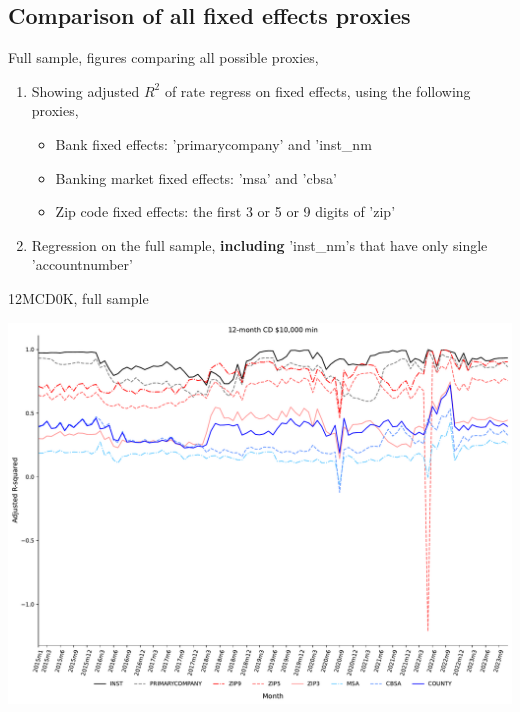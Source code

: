 \documentclass{beamer}
\begin{document}
\subsection{Comparison of all fixed effects proxies}

\begin{frame}
    \vfill
    \centering
    {Full sample, figures comparing all possible proxies,}
    \begin{enumerate}
        \item Showing adjusted $R^2$ of rate regress on fixed effects, using the following proxies, 
        \begin{itemize}
            \item Bank fixed effects: 'primarycompany' and 'inst\_nm
            \item Banking market fixed effects: 'msa' and 'cbsa'
            \item Zip code fixed effects: the first 3 or 5 or 9 digits of 'zip'
        \end{itemize}    
        \item Regression on the full sample, {\textbf{including}} 'inst\_nm's that have only single 'accountnumber'
    \end{enumerate}
    \vfill
\end{frame}



\begin{frame}{12MCD0K, full sample}
\begin{center}
\includegraphics[width=1\textwidth]{figure/all_sample_939605/all_fixed_effects/12MCD10K_adjusted_R2_all_fixed_effects.pdf} 
\end{center}
\end{frame}
\end{document}
